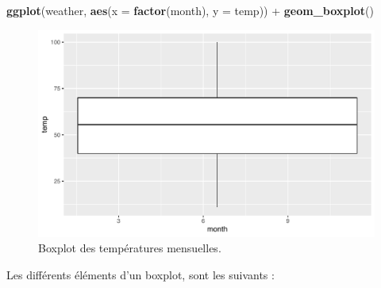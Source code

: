 \documentclass[a4paperpaper,]{article}
\newenvironment{Shaded}{\begin{snugshade}}{\end{snugshade}}
\newcommand{\DataTypeTok}[1]{\textcolor[rgb]{0.00,0.34,0.68}{#1}}
\newcommand{\KeywordTok}[1]{\textcolor[rgb]{0.12,0.11,0.11}{\textbf{#1}}}
\newcommand{\NormalTok}[1]{\textcolor[rgb]{0.12,0.11,0.11}{#1}}
\newcommand{\OperatorTok}[1]{\textcolor[rgb]{0.12,0.11,0.11}{#1}}
\newcommand{\StringTok}[1]{\textcolor[rgb]{0.75,0.01,0.01}{#1}}
\begin{document}
\begin{Shaded}
\begin{Highlighting}[]
\KeywordTok{ggplot}\NormalTok{(weather, }\KeywordTok{aes}\NormalTok{(}\DataTypeTok{x =} \KeywordTok{factor}\NormalTok{(month), }\DataTypeTok{y =}\NormalTok{ temp)) }\OperatorTok{+}
\StringTok{  }\KeywordTok{geom_boxplot}\NormalTok{()}
\end{Highlighting}
\end{Shaded}

\begin{figure}[htpb]

{\centering \includegraphics[width=0.9\linewidth]{figure/unnamed-chunk-54-1} 

}

\caption{Boxplot des températures mensuelles.}\label{fig:unnamed-chunk-54}
\end{figure}

Les différents éléments d'un boxplot, sont les suivants :
\end{document}
